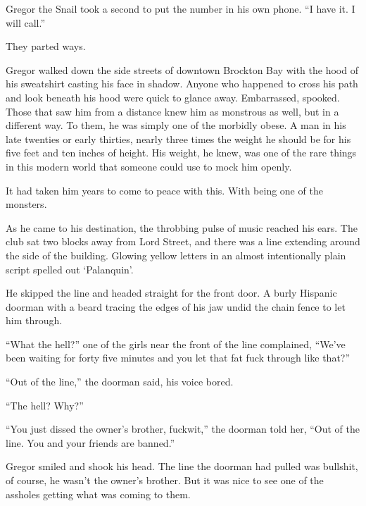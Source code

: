 Gregor the Snail took a second to put the number in his own phone.  ``I have it.  I will call.''



They parted ways.



Gregor walked down the side streets of downtown Brockton Bay with the hood of his sweatshirt casting his face in shadow.  Anyone who happened to cross his path and look beneath his hood were quick to glance away.  Embarrassed, spooked.  Those that saw him from a distance knew him as monstrous as well, but in a different way.  To them, he was simply one of the morbidly obese.  A man in his late twenties or early thirties, nearly three times the weight he should be for his five feet and ten inches of height.  His weight, he knew, was one of the rare things in this modern world that someone could use to mock him openly.



It had taken him years to come to peace with this.  With being one of the monsters.



As he came to his destination, the throbbing pulse of music reached his ears.  The club sat two blocks away from Lord Street, and there was a line extending around the side of the building.  Glowing yellow letters in an almost intentionally plain script spelled out `Palanquin'.



He skipped the line and headed straight for the front door.  A burly Hispanic doorman with a beard tracing the edges of his jaw undid the chain fence to let him through.



``What the hell?'' one of the girls near the front of the line complained, ``We've been waiting for forty five minutes and you let that fat fuck through like that?''



``Out of the line,'' the doorman said, his voice bored.



``The hell?  Why?''



``You just dissed the owner's brother, fuckwit,'' the doorman told her, ``Out of the line.  You and your friends are banned.''



Gregor smiled and shook his head.  The line the doorman had pulled was bullshit, of course, he wasn't the owner's brother.  But it was nice to see one of the assholes getting what was coming to them.



